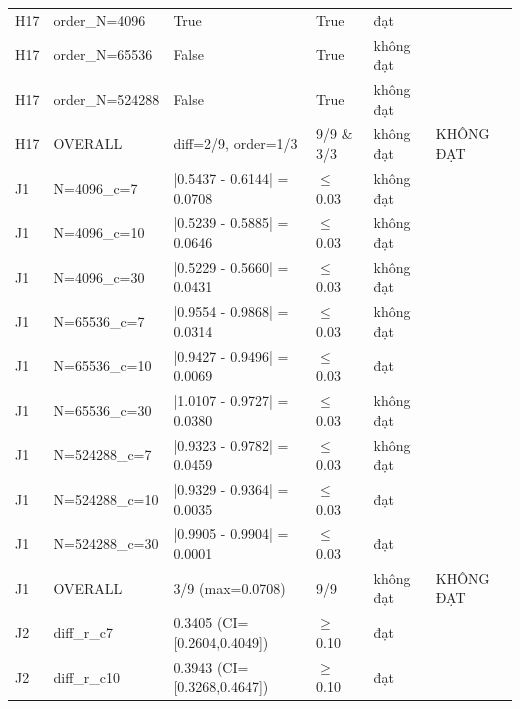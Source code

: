 \begin{longtable}{p{0.8cm}p{2.2cm}p{3.9cm}p{3.2cm}p{1.1cm}p{2.4cm}}
H17 & order\_\allowbreak{}N=\allowbreak{}4096 & True & True & đạt &  \\
H17 & order\_\allowbreak{}N=\allowbreak{}65536 & False & True & không đạt &  \\
H17 & order\_\allowbreak{}N=\allowbreak{}524288 & False & True & không đạt &  \\
H17 & OVERALL & diff=\allowbreak{}2/9, order=\allowbreak{}1/3 & 9/9 \& 3/3 & không đạt & KHÔNG ĐẠT \\
J1 & N=\allowbreak{}4096\_\allowbreak{}c=\allowbreak{}7 & |0.5437 - 0.6144| =\allowbreak{} 0.0708 & $\le$\allowbreak{} 0.03 & không đạt &  \\
J1 & N=\allowbreak{}4096\_\allowbreak{}c=\allowbreak{}10 & |0.5239 - 0.5885| =\allowbreak{} 0.0646 & $\le$\allowbreak{} 0.03 & không đạt &  \\
J1 & N=\allowbreak{}4096\_\allowbreak{}c=\allowbreak{}30 & |0.5229 - 0.5660| =\allowbreak{} 0.0431 & $\le$\allowbreak{} 0.03 & không đạt &  \\
J1 & N=\allowbreak{}65536\_\allowbreak{}c=\allowbreak{}7 & |0.9554 - 0.9868| =\allowbreak{} 0.0314 & $\le$\allowbreak{} 0.03 & không đạt &  \\
J1 & N=\allowbreak{}65536\_\allowbreak{}c=\allowbreak{}10 & |0.9427 - 0.9496| =\allowbreak{} 0.0069 & $\le$\allowbreak{} 0.03 & đạt &  \\
J1 & N=\allowbreak{}65536\_\allowbreak{}c=\allowbreak{}30 & |1.0107 - 0.9727| =\allowbreak{} 0.0380 & $\le$\allowbreak{} 0.03 & không đạt &  \\
J1 & N=\allowbreak{}524288\_\allowbreak{}c=\allowbreak{}7 & |0.9323 - 0.9782| =\allowbreak{} 0.0459 & $\le$\allowbreak{} 0.03 & không đạt &  \\
J1 & N=\allowbreak{}524288\_\allowbreak{}c=\allowbreak{}10 & |0.9329 - 0.9364| =\allowbreak{} 0.0035 & $\le$\allowbreak{} 0.03 & đạt &  \\
J1 & N=\allowbreak{}524288\_\allowbreak{}c=\allowbreak{}30 & |0.9905 - 0.9904| =\allowbreak{} 0.0001 & $\le$\allowbreak{} 0.03 & đạt &  \\
J1 & OVERALL & 3/9 (max=\allowbreak{}0.0708) & 9/9 & không đạt & KHÔNG ĐẠT \\
J2 & diff\_\allowbreak{}r\_\allowbreak{}c7 & 0.3405 (CI=\allowbreak{}[0.2604,\allowbreak{}0.4049]) & $\ge$\allowbreak{} 0.10 & đạt &  \\
J2 & diff\_\allowbreak{}r\_\allowbreak{}c10 & 0.3943 (CI=\allowbreak{}[0.3268,\allowbreak{}0.4647]) & $\ge$\allowbreak{} 0.10 & đạt &  \\

\end{longtable}
